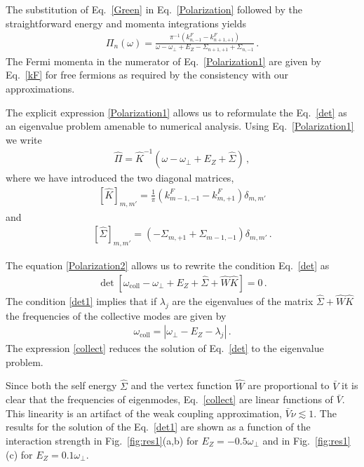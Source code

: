 The substitution of Eq.~\eqref{Green} in Eq.~\eqref{Polarization} followed by the straightforward energy and momenta integrations yields
\begin{align}\label{Polarization1}
\Pi_{n}(\omega) = 
\frac{\pi^{-1} \left( k^F_{n,-1} - k^F_{n+1,+1}\right) }{
\omega -\omega_{\perp} + E_Z
-
\Sigma_{n+1,+1} + \Sigma_{n,-1}
}\, .
\end{align}
The Fermi momenta in the numerator of Eq.~\eqref{Polarization1} are given by Eq.~\eqref{kF} for free fermions as required by the consistency with our approximations.


The explicit expression \eqref{Polarization1} allows us to reformulate the  Eq.~\eqref{det} as an eigenvalue problem amenable to numerical analysis.
Using Eq.~\eqref{Polarization1} we write
\begin{align}\label{Polarization2}
\hat{\Pi} = \hat{K}^{-1} \left( \omega - \omega_{\perp} + E_Z + \hat{\Sigma} \right)\, ,
\end{align}
where we have introduced the two diagonal matrices,
\begin{align}\label{hat_K}
\left[\hat{K}\right]_{m,m'} = \frac{1}{\pi} \left( k^{F}_{m-1,-1} - k^{F}_{m,+1} \right)\delta_{m,m'}
\end{align}
%
and
\begin{align}\label{hat_Sigma}
\left[\hat{\Sigma}\right]_{m,m'} = \left(- \Sigma_{m,+1} + \Sigma_{m-1,-1}\right) \delta_{m,m'} \, .
\end{align}


The equation \eqref{Polarization2} allows us to rewrite the condition Eq.~\eqref{det} as
\begin{align}\label{det1}
\det \left[  \omega_{\mathrm{coll}} - \omega_{\perp} + E_Z + \hat{\Sigma}  + \hat{W} \hat{K}  \right] = 0\, .
\end{align}
The condition \eqref{det1} implies that if $\lambda_j$ are the eigenvalues of the matrix $\hat{\Sigma}  +\hat{W} \hat{K}$ the frequencies of the collective modes are given by 
\begin{align}\label{collect}
\omega_{\mathrm{coll}} = \left| \omega_{\perp} - E_Z - \lambda_j \right|\, .
\end{align}
The expression \eqref{collect} reduces the solution of Eq.~\eqref{det} to the eigenvalue problem.



Since both the self energy $\hat{\Sigma}$ and the vertex function $\hat{W}$ are proportional to $\bar{V}$ it is clear that the frequencies of eigenmodes, Eq.~\eqref{collect} are linear functions of $\bar{V}$.
This linearity is an artifact of the weak coupling approximation, $\bar{V} \nu \lesssim 1$.
The results for the solution of the Eq.~\eqref{det1} are shown as a function of the interaction strength in Fig.~\ref{fig:res1}(a,b)  for $E_Z = -0.5 \omega_{\perp}$ and in Fig.~\ref{fig:res1}(c) for $E_Z = 0.1 \omega_{\perp}$.
%
%
%
